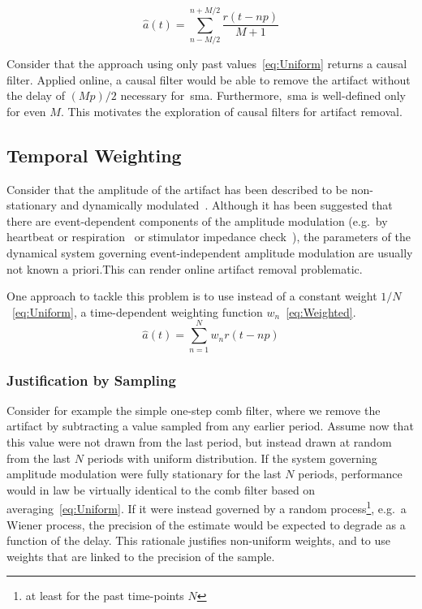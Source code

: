\documentclass[a4paper]{article}
\begin{document}
\begin{equation}
    \hat{a}(t) = \sum_{n-M/2}^{n+M/2} \frac{r(t - np)}{M+1}\label{eq:SMA}
\end{equation}

Consider that the approach using only past values~\eqref{eq:Uniform} returns a causal filter. Applied online, a causal filter would be able to remove the artifact without the delay of $(Mp)/2$ necessary for~\gls{sma}. Furthermore,~\gls{sma} is well-defined only for even $M$. This motivates the exploration of causal filters for artifact removal.

\subsection{Temporal Weighting}

Consider that the amplitude of the  artifact has been described to be non-stationary and dynamically modulated~\citep{Noury_2016,Neuling_2017}.
Although it has been suggested that there are event-dependent components of the amplitude modulation (e.g.\ by heartbeat or respiration~\cite{Noury_2016} or stimulator impedance check~\cite{Neuling_2017}), the parameters of the dynamical system governing event-independent amplitude modulation are usually not known a priori.This can render online artifact removal problematic.

One approach to tackle this problem is to use instead of a constant weight $1/N$~\eqref{eq:Uniform}, a time-dependent weighting function $w_n$~\eqref{eq:Weighted}.
\begin{equation}
    \hat{a}(t) = \sum_{n=1}^{N} w_n r(t - np)\label{eq:Weighted}
\end{equation}

\subsubsection{Justification by Sampling}
Consider for example the simple one-step comb filter, where we remove the artifact by subtracting a value sampled from any earlier period.
Assume now that this value were not drawn from the last period, but instead drawn at random from the last $N$ periods with uniform distribution. If the system governing amplitude modulation were fully stationary for the last $N$ periods, performance would in law be virtually identical to the comb filter based on averaging~\eqref{eq:Uniform}.
If it were instead governed by a random process\footnote{at least for the past time-points $N$}, e.g.\ a Wiener process, the precision of the estimate would be expected to degrade as a function of the delay. This rationale justifies non-uniform weights, and to use weights that are linked to the precision of the sample.
\end{document}
